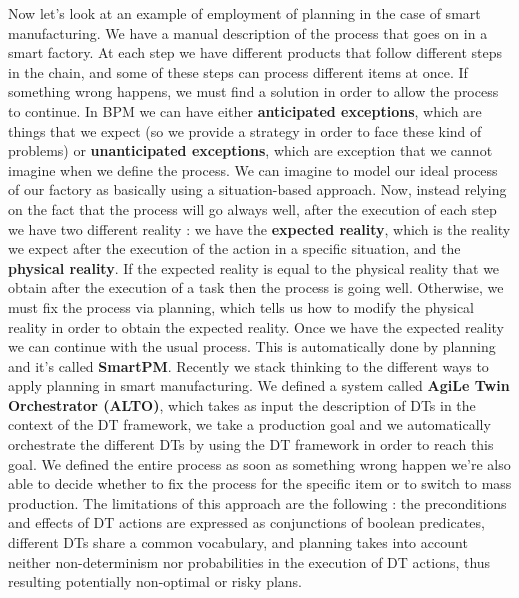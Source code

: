 \documentclass[11pt]{article}
\begin{document}
Now let's look at an example of employment of planning in the case of smart manufacturing. We have a manual description of the process that goes on in a smart factory. At each step we have different products that follow different steps in the chain, and some of these steps can process different items at once. If something wrong happens, we must find a solution in order to allow the process to continue. In BPM we can have either \textbf{anticipated exceptions}, which are things that we expect (so we provide a strategy in order to face these kind of problems) or \textbf{unanticipated exceptions}, which are exception that we cannot imagine when we define the process. We can imagine to model our ideal process of our factory as basically using a situation-based approach. Now, instead relying on the fact that the process will go always well, after the execution of each step we have two different reality : we have the \textbf{expected reality}, which is the reality we expect after the execution of the action in a specific situation, and the \textbf{physical reality}. If the expected reality is equal to the physical reality that we obtain after the execution of a task then the process is going well. Otherwise, we must fix the process via planning, which tells us how to modify the physical reality in order to obtain the expected reality. Once we have the expected reality we can continue with the usual process. This is automatically done by planning and it's called \textbf{SmartPM}. Recently we stack thinking to the different ways to apply planning in smart manufacturing. We defined a system called \textbf{AgiLe Twin Orchestrator (ALTO)}, which takes as input the description of DTs in the context of the DT framework, we take a production goal and we automatically orchestrate the different DTs by using the DT framework in order to reach this goal. We defined the entire process as soon as something wrong happen we're also able to decide whether to fix the process for the specific item or to switch to mass production. The limitations of this approach are the following : the preconditions and effects of DT actions are expressed as conjunctions of boolean predicates, different DTs share a common vocabulary, and planning takes into account neither non-determinism nor probabilities in the execution of DT actions, thus resulting potentially non-optimal or risky plans. 
\end{document}
